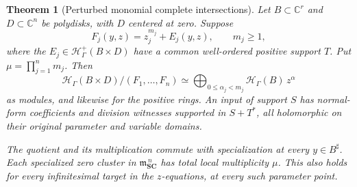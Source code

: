 \documentclass[11pt,letterpaper]{article}
\newtheorem{theorem}{Theorem}[section]
\theoremstyle{definition}
\theoremstyle{remark}
\newcommand{\SC}{\mathbf{SC}}
\newcommand{\C}{\mathbb C}
\newcommand{\HH}{\mathcal H}
\newcommand{\mm}{\mathfrak m}
\newcommand{\sh}{^{\sharp}}
\newcommand{\Hp}{\HH^{+}_{\Gamma}}
\newcommand{\Hh}{\HH_{\Gamma}}
\begin{document}
\begin{theorem}[Perturbed monomial complete intersections]\label{thm:family}
Let $B\subset\C^r$ and $D\subset\C^n$ be polydisks, with $D$ centered at zero. Suppose
\begin{equation}\label{eq:monomialfamily}
 F_j(y,z)=z_j^{m_j}+E_j(y,z),\qquad m_j\geq1,
\end{equation}
where the $E_j\in\Hp(B\times D)$ have a common well-ordered positive support $T$. Put $\mu=\prod_{j=1}^{n}m_j$. Then
\begin{equation}\label{eq:familyfree}
 \Hh(B\times D)/(F_1,\ldots,F_n)
  \simeq \bigoplus_{0\leq\alpha_j<m_j}\Hh(B)\,z^\alpha
\end{equation}
as modules, and likewise for the positive rings. An input of support $S$ has normal-form coefficients and division witnesses supported in $S+T^*$, all holomorphic on their original parameter and variable domains.

The quotient and its multiplication commute with specialization at every $y\in B\sh$. Each specialized zero cluster in $\mm_{\SC}^{\,n}$ has total local multiplicity $\mu$. This also holds for every infinitesimal target in the $z$-equations, at every such parameter point.
\end{theorem}
\end{document}
